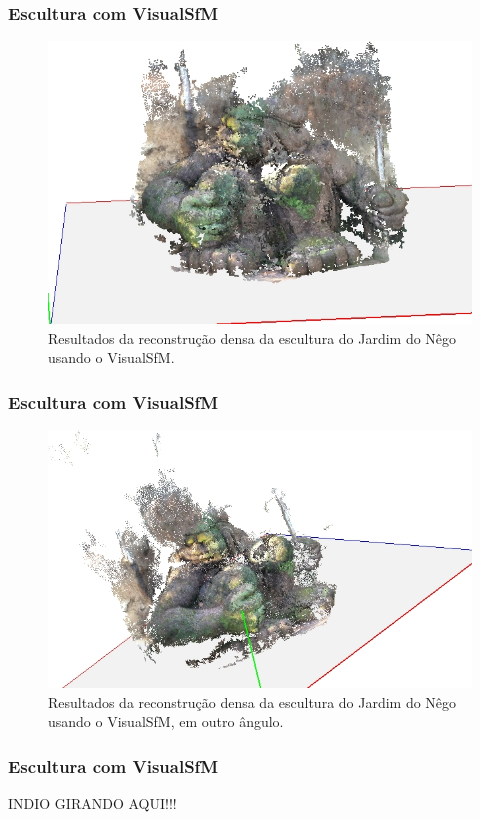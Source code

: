 \documentclass[table, usenames, svgnames, xcolor=dvipsnames]{beamer}
\begin{document}
\begin{frame}
\frametitle{\textbf{Escultura com VisualSfM}}
	\begin{figure}[!h]
		\centering
		\includegraphics[width=0.75\linewidth]{figs/guerreirovisualsfmdmr.jpg}
		\caption{%
		Resultados da reconstrução densa da escultura do Jardim do Nêgo usando o VisualSfM.
		}\label{fig:reconstrucaoDensaIndioVisualSFM}
	\end{figure}
\end{frame}

\begin{frame}
\frametitle{\textbf{Escultura com VisualSfM}}
	\begin{figure}[!h]
		\centering
		\includegraphics[width=0.8\linewidth]{figs/guerreirovisualsfmdmr2.jpg}
		\caption{%
		Resultados da reconstrução densa da escultura do Jardim do Nêgo usando o VisualSfM, em outro ângulo.
		}
	\end{figure}
\end{frame}

\begin{frame}
\frametitle{\textbf{Escultura com VisualSfM}}
	INDIO GIRANDO AQUI!!!
\end{frame}

\end{document}
